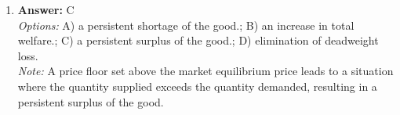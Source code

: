 \documentclass[12pt]{article}
\begin{document}
\begin{enumerate}[label=\arabic*.]
\\ \textit{Note:} When both short-run aggregate supply and aggregate demand increase, real GDP will definitely rise due to the higher production and consumption levels, but the change in the price level is uncertain because the extent of the shifts in supply and demand can lead to varying impacts on prices.
\item \textbf{Answer:} C
\\ \textit{Options:} A) a persistent shortage of the good.; B) an increase in total welfare.; C) a persistent surplus of the good.; D) elimination of deadweight loss.
\\ \textit{Note:} A price floor set above the market equilibrium price leads to a situation where the quantity supplied exceeds the quantity demanded, resulting in a persistent surplus of the good.
\end{enumerate}
\end{document}
